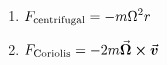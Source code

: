 

\vspace*{\fill}
\centering

\begin{enumerate}
    \item $\displaystyle F_{\rm centrifugal} = -m \Omega^2 r$ 
    \item $\displaystyle F_{\rm Coriolis} = -2m \va*{\Omega} \cross \va*{v}$
\end{enumerate}

\centering
\vspace*{\fill}

